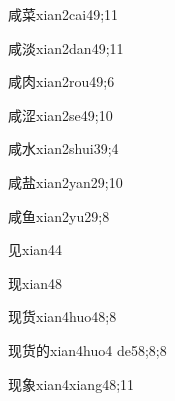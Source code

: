 \begin{verbete}{咸菜}{xian2cai4}{9;11}
\end{verbete}

\begin{verbete}{咸淡}{xian2dan4}{9;11}
\end{verbete}

\begin{verbete}{咸肉}{xian2rou4}{9;6}
\end{verbete}

\begin{verbete}{咸涩}{xian2se4}{9;10}
\end{verbete}

\begin{verbete}{咸水}{xian2shui3}{9;4}
\end{verbete}

\begin{verbete}{咸盐}{xian2yan2}{9;10}
\end{verbete}

\begin{verbete}{咸鱼}{xian2yu2}{9;8}
\end{verbete}

\begin{verbete}{见}{xian4}{4}
\end{verbete}

\begin{verbete}{现}{xian4}{8}
\end{verbete}

\begin{verbete}{现货}{xian4huo4}{8;8}
\end{verbete}

\begin{verbete}{现货的}{xian4huo4 de5}{8;8;8}
\end{verbete}

\begin{verbete}{现象}{xian4xiang4}{8;11}
\end{verbete}

